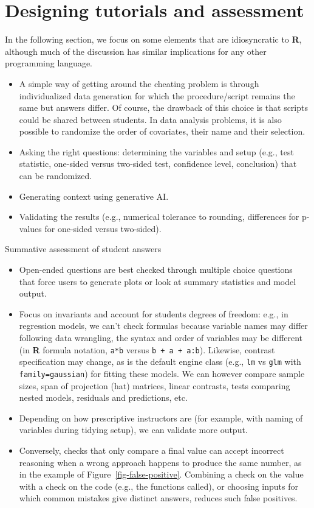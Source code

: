 \documentclass[
  12pt]{article}
\providecommand{\tightlist}{%
  \setlength{\itemsep}{0pt}\setlength{\parskip}{0pt}}
\begin{document}
\section{Designing tutorials and assessment}\label{sec-design}

In the following section, we focus on some elements that are
idiosyncratic to \textbf{R}, although much of the discussion has similar
implications for any other programming language.

\begin{itemize}
\tightlist
\item
  A simple way of getting around the cheating problem is through
  individualized data generation for which the procedure/script remains
  the same but answers differ. Of course, the drawback of this choice is
  that scripts could be shared between students. In data analysis
  problems, it is also possible to randomize the order of covariates,
  their name and their selection.
\item
  Asking the right questions: determining the variables and setup (e.g.,
  test statistic, one-sided versus two-sided test, confidence level,
  conclusion) that can be randomized.
\item
  Generating context using generative AI.
\item
  Validating the results (e.g., numerical tolerance to rounding,
  differences for p-values for one-sided versus two-sided).
\end{itemize}

Summative assessment of student answers

\begin{itemize}
\tightlist
\item
  Open-ended questions are best checked through multiple choice
  questions that force users to generate plots or look at summary
  statistics and model output.
\item
  Focus on invariants and account for students degrees of freedom: e.g.,
  in regression models, we can't check formulas because variable names
  may differ following data wrangling, the syntax and order of variables
  may be different (in \textbf{R} formula notation, \texttt{a*b} versus
  \texttt{b\ +\ a\ +\ a:b}). Likewise, contrast specification may
  change, as is the default engine class (e.g., \texttt{lm} vs
  \texttt{glm} with \texttt{family=gaussian}) for fitting these models.
  We can however compare sample sizes, span of projection (hat)
  matrices, linear contrasts, tests comparing nested models, residuals
  and predictions, etc.
\item
  Depending on how prescriptive instructors are (for example, with
  naming of variables during tidying setup), we can validate more
  output.
\item
  Conversely, checks that only compare a final value can accept
  incorrect reasoning when a wrong approach happens to produce the same
  number, as in the example of Figure~\ref{fig-false-positive}.
  Combining a check on the value with a check on the code (e.g., the
  functions called), or choosing inputs for which common mistakes give
  distinct answers, reduces such false positives.
\end{itemize}
\end{document}
